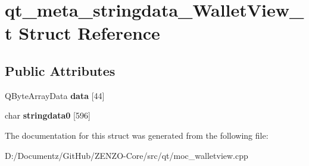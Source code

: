 \hypertarget{structqt__meta__stringdata___wallet_view__t}{}\section{qt\+\_\+meta\+\_\+stringdata\+\_\+\+Wallet\+View\+\_\+t Struct Reference}
\label{structqt__meta__stringdata___wallet_view__t}
\subsection*{Public Attributes}
\begin{DoxyCompactItemize}
\item 
\mbox{\label{structqt__meta__stringdata___wallet_view__t_a5a173dc2650c208b47373e1a38bb7787}} 
Q\+Byte\+Array\+Data {\bfseries data} \mbox{[}44\mbox{]}
\item 
\mbox{\label{structqt__meta__stringdata___wallet_view__t_a53722e62e246a53960d787bda8a21589}} 
char {\bfseries stringdata0} \mbox{[}596\mbox{]}
\end{DoxyCompactItemize}


The documentation for this struct was generated from the following file\+:\begin{DoxyCompactItemize}
\item 
D\+:/\+Documentz/\+Git\+Hub/\+Z\+E\+N\+Z\+O-\/\+Core/src/qt/moc\+\_\+walletview.\+cpp\end{DoxyCompactItemize}
